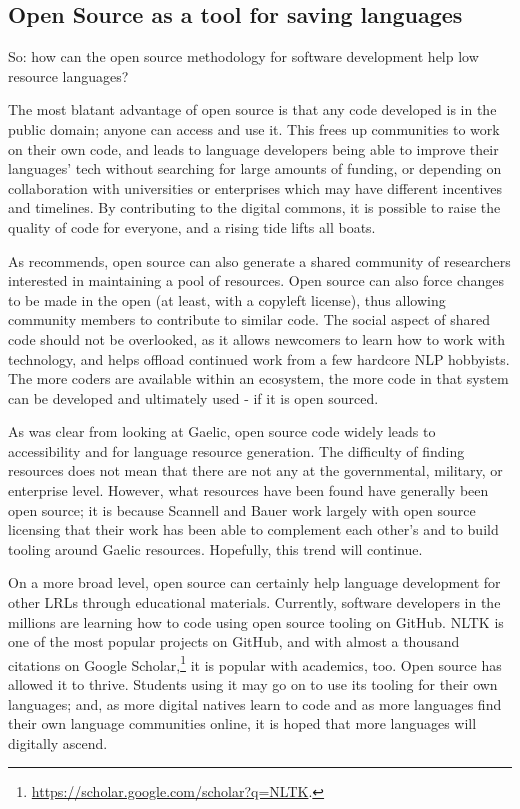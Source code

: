 \subsection{Open Source as a tool for saving languages}

So: how can the open source methodology for software development help low resource languages?

The most blatant advantage of open source is that any code developed is in the public domain; anyone can access and use it. This frees up communities to work on their own code, and leads to language developers being able to improve their languages' tech without searching for large amounts of funding, or depending on collaboration with universities or enterprises which may have different incentives and timelines. By contributing to the digital commons, it is possible to raise the quality of code for everyone, and a rising tide lifts all boats.

As \citet{streiter2006implementing} recommends, open source can also generate a shared community of researchers interested in maintaining a pool of resources. Open source can also force changes to be made in the open (at least, with a copyleft license), thus allowing community members to contribute to similar code. The social aspect of shared code should not be overlooked, as it allows newcomers to learn how to work with technology, and helps offload continued work from a few hardcore NLP hobbyists. The more coders are available within an ecosystem, the more code in that system can be developed and ultimately used - if it is open sourced.

As was clear from looking at Gaelic, open source code widely leads to accessibility and for language resource generation. The difficulty of finding resources does not mean that there are not any at the governmental, military, or enterprise level. However, what resources have been found have generally been open source; it is because Scannell and Bauer work largely with open source licensing that their work has been able to complement each other's and to build tooling around Gaelic resources. Hopefully, this trend will continue.

On a more broad level, open source can certainly help language development for other LRLs through educational materials. Currently, software developers in the millions are learning how to code using open source tooling on GitHub. NLTK is one of the most popular projects on GitHub, and with almost a thousand citations on Google Scholar,\footnote{\href{https://scholar.google.com/scholar?q=NLTK}{https://scholar.google.com/scholar?q=NLTK}. } it is popular with academics, too. Open source has allowed it to thrive. Students using it may go on to use its tooling for their own languages; and, as more digital natives learn to code and as more languages find their own language communities online, it is hoped that more languages will digitally ascend.

